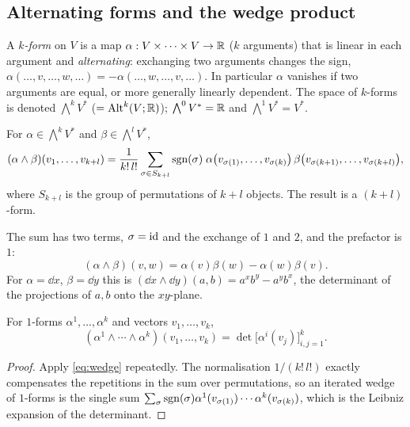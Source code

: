 \subsection{Alternating forms and the wedge product}\label{sec:altforms}

\begin{definition}
A \emph{$k$-form} on $V$ is a map $\alpha:V\times\cdots\times V\to\mathbb{R}$ ($k$ arguments) that is linear in each argument and
\emph{alternating}: exchanging two arguments changes the sign,
$\alpha(\dots,v,\dots,w,\dots)=-\alpha(\dots,w,\dots,v,\dots)$. In particular $\alpha$ vanishes if two arguments are equal,
or more generally linearly dependent. The space of $k$-forms is denoted $\bigwedge^kV^*$ ($=\mathrm{Alt}^k(V;\mathbb{R})$); $\bigwedge^0V^*=\mathbb{R}$ and
$\bigwedge^1V^*=V^*$.
\end{definition}

\begin{definition}
For $\alpha\in\bigwedge^kV^*$ and $\beta\in\bigwedge^lV^*$,
\begin{equation}\label{eq:wedge}
(\alpha\wedge\beta)(v_1,\dots,v_{k+l})=\frac1{k!\,l!}\sum_{\sigma\in S_{k+l}}\mathrm{sgn}(\sigma)\;
\alpha\bigl(v_{\sigma(1)},\dots,v_{\sigma(k)}\bigr)\,\beta\bigl(v_{\sigma(k+1)},\dots,v_{\sigma(k+l)}\bigr),
\end{equation}
where $S_{k+l}$ is the group of permutations of $k+l$ objects. The result is a $(k+l)$-form.
\end{definition}

\begin{specialcase}[$k=l=1$: the case that matters most]
The sum has two terms, $\sigma=\mathrm{id}$ and the exchange of $1$ and $2$, and the prefactor is $1$:
\begin{equation}\label{eq:wedge11}
(\alpha\wedge\beta)(v,w)=\alpha(v)\beta(w)-\alpha(w)\beta(v).
\end{equation}
For $\alpha=\dd x$, $\beta=\dd y$ this is $(\dd x\wedge\dd y)(a,b)=a^xb^y-a^yb^x$, the determinant of the projections of
$a,b$ onto the $xy$-plane.
\end{specialcase}

\begin{proposition}\label{prop:detformula}
For $1$-forms $\alpha^1,\dots,\alpha^k$ and vectors $v_1,\dots,v_k$,
\begin{equation}\label{eq:detformula}
(\alpha^1\wedge\cdots\wedge\alpha^k)(v_1,\dots,v_k)=\det\bigl[\alpha^i(v_j)\bigr]_{i,j=1}^k .
\end{equation}
\end{proposition}
\begin{proof}
Apply \eqref{eq:wedge} repeatedly. The normalisation $1/(k!\,l!)$ exactly compensates the repetitions in the sum over
permutations, so an iterated wedge of $1$-forms is the single sum $\sum_\sigma\mathrm{sgn}(\sigma)\alpha^1(v_{\sigma(1)})\cdots\alpha^k(v_{\sigma(k)})$,
which is the Leibniz expansion of the determinant.
\end{proof}

